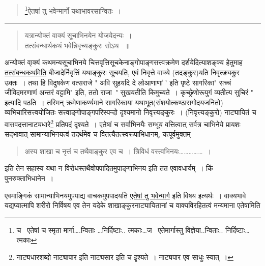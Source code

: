 \documentclass[11pt, openany]{book}
\begin{document}
{\begin{quote}
{\renewcommand{\thefootnote}{4}\footnote{च \textendash\ एतेषां च स्मृता मार्गा\ldots .न्विताः \ldots निर्दिष्टाः.. त्मकाः\ldots ज \textendash\ एतेमार्गास्तु विज्ञेया..न्विताः.. निर्दिष्टाः\ldots त्मकाः }ऐतषां तु भवेन्मार्गो यथाभावरसान्वितः~। }
\end{quote}

\hrule

\vspace{2mm}

\begin{quote}
 {\qt यत्रान्योक्तं वाक्यं सूचाभिनयेन योजयेदन्यः~। \\
तत्संबन्धार्थकथं भवेन्निवृच्यङ्कुरः सोऽथ ~॥}
\end{quote}
 
अन्योक्तं वा्क्यं कथमन्यसूचाभिनये चित्तवृत्तिसूचकेनाङ्गोपाङ्गसत्त्वक्रमेण दर्शयेदित्याशङ्क्य हेतुमाह \underline{तत्संबन्धकथमिति} बीजादेर्निवृत्तिं यथाङ्कुरः सूचयति, एवं निवृत्ते वाक्ये (तदङ्कुर)यति निवृत्ङ्यकुर उक्तः~। तथा हि विदुषकेण वत्सराजे " अवि सुहयदि दे लोआणाणां ' इति पृष्टे सागरिका" सच्चं जीविदमरणाणं अन्तरं वट्टामि" इति, ततो राजा\textendash\ " सुखयतीति किमुच्यते~। कृच्छ्रेणोरूयुगं व्यतीत्य सुचिरं " इत्यादि पठति~। तस्मिन् क्रमेणाकर्ण्यमाने सागरिकाया यथाभूत(संशयोत्कण्ठारागोदयजनितो) व्यभिचारिसत्त्वयोजितः सत्त्वाङ्गोपाङ्गपरिस्पन्दो दृश्यमानो निवृत्त्यङ्कुरः~। (निवृत्त्यङ्कुरो) नाट्यायितं च वासवदत्तानाट्यधारे\renewcommand{\thefootnote}{*}\footnote{नाट्यधारशब्दो नाट्यापार इति नाट्यसार इति च इृश्यते~। नाट्यपार एव साधुः स्यात्~। } प्रतिपदं दृश्यते~। एतेषां च सर्वाभिनयैः सम्भूय वत्तित्वात् सर्वत्र चाभिनेये प्रायशः सद्भावात् सामान्याभिनयत्वं तदर्थमेव च वितत्यैतत्स्वरूपाभिधानम्, यत्पूर्वमुक्तम्\textendash\ 

\begin{sloppypar}
\begin{quote}
 {\qt अस्य शाखा च नृत्तं च तथैवाङ्कुर एव च~। 
त्रिविधं वस्त्वभिनयः\ldots \ldots \ldots \ldots \ldots ~। }
\end{quote}
\end{sloppypar}

इति तेन सहास्य यथा न विरोधस्तथैवोपपादितमुपाङ्गाभिनय इति तत एवावधार्यम्~। किं पुनरुक्ताभिधानेन~। \\

\begin{sloppypar}
एवमाङ्गिकं सामान्याभिनयमुपपाद्य वाचकमुपपादयति \underline{एतेषां तु भवेन्मार्ग} इति विषय इत्यर्थः~। वाक्यभावे यद्यप्यात्मापि शरीरो निर्विषय एव तेन यदेके शाखाङ्कुरनाट्यायितानां च वाक्यविरहितत्वं मन्यमाना एतेषामिति
\end{sloppypar}
 
}
\end{document}
